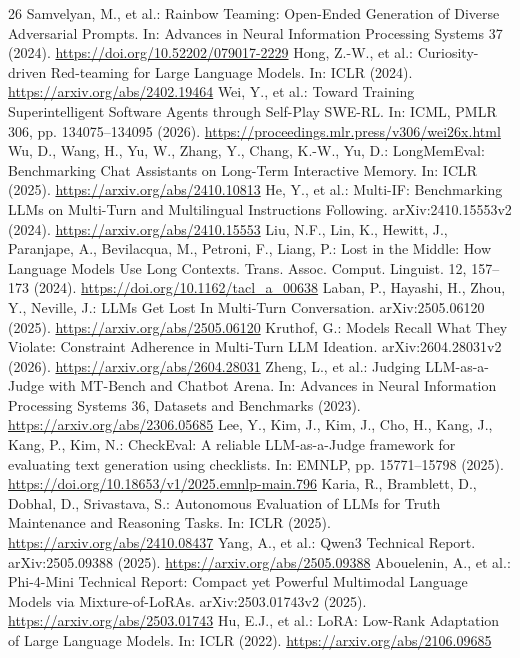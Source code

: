 \documentclass{svproc}
\begin{document}
\begin{thebibliography}{26}
 Samvelyan, M., et al.: Rainbow Teaming: Open-Ended Generation of Diverse Adversarial Prompts. In: Advances in Neural Information Processing Systems 37 (2024). \url{https://doi.org/10.52202/079017-2229}
 Hong, Z.-W., et al.: Curiosity-driven Red-teaming for Large Language Models. In: ICLR (2024). \url{https://arxiv.org/abs/2402.19464}
 Wei, Y., et al.: Toward Training Superintelligent Software Agents through Self-Play SWE-RL. In: ICML, PMLR 306, pp. 134075--134095 (2026). \url{https://proceedings.mlr.press/v306/wei26x.html}
 Wu, D., Wang, H., Yu, W., Zhang, Y., Chang, K.-W., Yu, D.: LongMemEval: Benchmarking Chat Assistants on Long-Term Interactive Memory. In: ICLR (2025). \url{https://arxiv.org/abs/2410.10813}
 He, Y., et al.: Multi-IF: Benchmarking LLMs on Multi-Turn and Multilingual Instructions Following. arXiv:2410.15553v2 (2024). \url{https://arxiv.org/abs/2410.15553}
 Liu, N.F., Lin, K., Hewitt, J., Paranjape, A., Bevilacqua, M., Petroni, F., Liang, P.: Lost in the Middle: How Language Models Use Long Contexts. Trans. Assoc. Comput. Linguist. 12, 157--173 (2024). \url{https://doi.org/10.1162/tacl_a_00638}
 Laban, P., Hayashi, H., Zhou, Y., Neville, J.: LLMs Get Lost In Multi-Turn Conversation. arXiv:2505.06120 (2025). \url{https://arxiv.org/abs/2505.06120}
 Kruthof, G.: Models Recall What They Violate: Constraint Adherence in Multi-Turn LLM Ideation. arXiv:2604.28031v2 (2026). \url{https://arxiv.org/abs/2604.28031}
 Zheng, L., et al.: Judging LLM-as-a-Judge with MT-Bench and Chatbot Arena. In: Advances in Neural Information Processing Systems 36, Datasets and Benchmarks (2023). \url{https://arxiv.org/abs/2306.05685}
 Lee, Y., Kim, J., Kim, J., Cho, H., Kang, J., Kang, P., Kim, N.: CheckEval: A reliable LLM-as-a-Judge framework for evaluating text generation using checklists. In: EMNLP, pp. 15771--15798 (2025). \url{https://doi.org/10.18653/v1/2025.emnlp-main.796}
 Karia, R., Bramblett, D., Dobhal, D., Srivastava, S.: Autonomous Evaluation of LLMs for Truth Maintenance and Reasoning Tasks. In: ICLR (2025). \url{https://arxiv.org/abs/2410.08437}
 Yang, A., et al.: Qwen3 Technical Report. arXiv:2505.09388 (2025). \url{https://arxiv.org/abs/2505.09388}
 Abouelenin, A., et al.: Phi-4-Mini Technical Report: Compact yet Powerful Multimodal Language Models via Mixture-of-LoRAs. arXiv:2503.01743v2 (2025). \url{https://arxiv.org/abs/2503.01743}
 Hu, E.J., et al.: LoRA: Low-Rank Adaptation of Large Language Models. In: ICLR (2022). \url{https://arxiv.org/abs/2106.09685}
\end{thebibliography}
\end{document}
